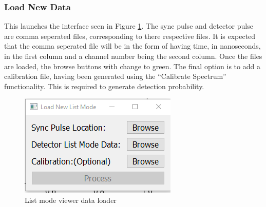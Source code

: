 \subsubsection{Load New Data}
This launches the interface seen in Figure \ref{fig:new_loader}. The sync pulse and detector pulse are comma seperated files, corresponding to there respective files. It is expected that the comma seperated file will be in the form of having time, in nanoseconds, in the first column and a channel number being the second column. Once the files are loaded, the browse buttons with change to green. The final option is to add a calibration file, having been generated using the ``Calibrate Spectrum'' functionality. This is required to generate detection probability.
\begin{figure}[h!]
	\centering
	\includegraphics[width=0.5\linewidth]{load_new_viewer.png}
	\caption{List mode viewer data loader}
	\label{fig:new_loader}
\end{figure}
